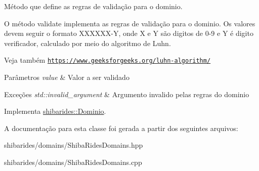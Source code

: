 Método que define as regras de validação para o dominio. 

O método validate implementa as regras de validação para o dominio. Os valores devem seguir o formato X\+X\+X\+X\+X\+X-\/Y, onde X e Y são digitos de 0-\/9 e Y é digito verificador, calculado por meio do algoritmo de Luhn.

\begin{DoxySeeAlso}{Veja também}
\href{https://www.geeksforgeeks.org/luhn-algorithm/}{\tt https\+://www.\+geeksforgeeks.\+org/luhn-\/algorithm/}
\end{DoxySeeAlso}

\begin{DoxyParams}{Parâmetros}
{\em value} & Valor a ser validado \\
\hline
\end{DoxyParams}

\begin{DoxyExceptions}{Exceções}
{\em std\+::invalid\+\_\+argument} & Argumento invalido pelas regras do dominio \\
\hline
\end{DoxyExceptions}


Implementa \hyperlink{classshibarides_1_1Dominio_acc9445531455c072bbf708709aebbe55}{shibarides\+::\+Dominio}.



A documentação para esta classe foi gerada a partir dos seguintes arquivos\+:\begin{DoxyCompactItemize}
\item 
shibarides/domains/Shiba\+Rides\+Domains.\+hpp\item 
shibarides/domains/Shiba\+Rides\+Domains.\+cpp\end{DoxyCompactItemize}
